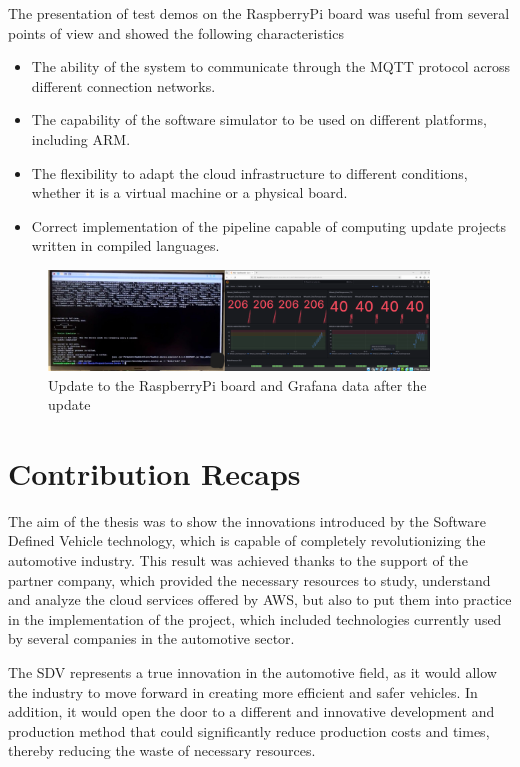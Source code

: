 The presentation of test demos on the RaspberryPi board was useful from several points of view and showed the following characteristics
\begin{itemize}
    \item The ability of the system to communicate through the MQTT protocol across different connection networks.
    \item The capability of the software simulator to be used on different platforms, including ARM.
    \item The flexibility to adapt the cloud infrastructure to different conditions, whether it is a virtual machine or a physical board.
    \item Correct implementation of the pipeline capable of computing update projects written in compiled languages.
\end{itemize}
\begin{figure}[h]  %
    \centering
    \includegraphics[width=0.9\textwidth]{images/RaspberryPiDemoUpdate.png}  %
    \caption{Update to the RaspberryPi board and Grafana data after the update}
    \label{fig:RaspberryPiDemoUpdate}
\end{figure}

\section{Contribution Recaps}
The aim of the thesis was to show the innovations introduced by the Software Defined Vehicle technology, which is capable of completely revolutionizing the automotive industry. This result was achieved thanks to the support of the partner company, which provided the necessary resources to study, understand and analyze the cloud services offered by AWS, but also to put them into practice in the implementation of the project, which included technologies currently used by several companies in the automotive sector.

The SDV represents a true innovation in the automotive field, as it would allow the industry to move forward in creating more efficient and safer vehicles. In addition, it would open the door to a different and innovative development and production method that could significantly reduce production costs and times, thereby reducing the waste of necessary resources.

